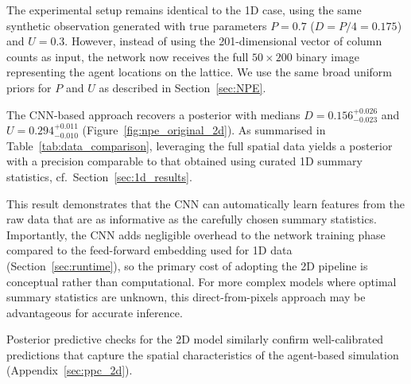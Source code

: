 \documentclass{article}
\begin{document}
The experimental setup remains identical to the 1D case, using the same synthetic observation generated with true parameters $P = 0.7$ ($D = P/4 = 0.175$) and $U = 0.3$. However, instead of using the 201-dimensional vector of column counts as input, the network now receives the full $50 \times 200$ binary image representing the agent locations on the lattice. We use the same broad uniform priors for $P$ and $U$ as described in Section~\ref{sec:NPE}.

The CNN-based approach recovers a posterior with medians $D = 0.156^{+0.026}_{-0.023}$
 and $U = 0.294^{+0.011}_{-0.010}$ (Figure~\ref{fig:npe_original_2d}). As summarised in Table~\ref{tab:data_comparison}, leveraging the full spatial data yields a posterior with a precision comparable to that obtained using curated 1D summary statistics, cf.\ Section~\ref{sec:1d_results}.

This result demonstrates that the CNN can automatically learn features from the raw data that are as informative as the carefully chosen summary statistics. Importantly, the CNN adds negligible overhead to the network training phase compared to the feed-forward embedding used for 1D data (Section~\ref{sec:runtime}), so the primary cost of adopting the 2D pipeline is conceptual rather than computational. For more complex models where optimal summary statistics are unknown, this direct-from-pixels approach may be advantageous for accurate inference.

Posterior predictive checks for the 2D model similarly confirm well-calibrated predictions that capture the spatial characteristics of the agent-based simulation (Appendix~\ref{sec:ppc_2d}).
\end{document}
